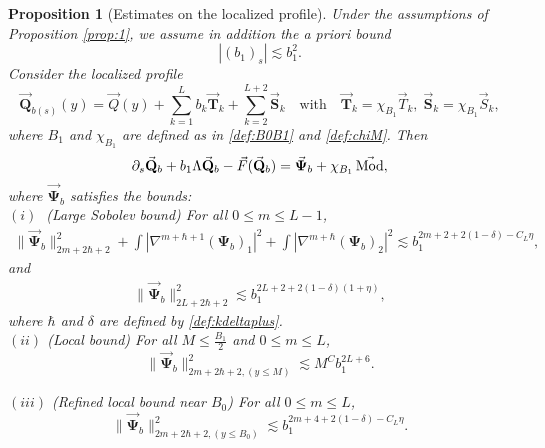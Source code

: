 \documentclass[11pt]{aims}
\newtheorem{proposition}[theorem]{Proposition}
\theoremstyle{definition}
\numberwithin{equation}{section}
\begin{document}
\begin{proposition}[Estimates on the localized profile] \label{prop:localProfile} Under the assumptions of Proposition \ref{prop:1}, we assume in addition the a priori bound 
\begin{equation}\label{eq:apriorib1}
|(b_1)_s| \lesssim b_1^2.
\end{equation}
Consider the localized profile
\begin{equation}\label{def:Qbtil}
\vec{\mathbf{Q}}_{b(s)}(y) = \vec Q(y) + \sum_{k = 1}^Lb_k\vec{\mathbf{T}}_k + \sum_{k = 2}^{L+2}\vec{\mathbf{S}}_k \quad \text{with}\quad \vec{\mathbf{T}}_k = \chi_{B_1}\vec T_k, \; \vec{\mathbf{S}}_k = \chi_{B_1}\vec S_k,
\end{equation}
where $B_1$ and $\chi_{B_1}$ are defined as in \eqref{def:B0B1} and \eqref{def:chiM}. Then
\begin{equation}\label{def:Psibtilde}
\partial_s \vec{\mathbf{Q}}_{b} + b_1 \Lambda \vec{\mathbf{Q}}_b  - \vec F (\vec{\mathbf{Q}}_b) = \vec{\mathbf{\Psi}}_b + \chi_{B_1}\,\vec{\textup{Mod}},
\end{equation}
where $\vec{\mathbf{\Psi}}_{b}$ satisfies the bounds:\\

\noindent $(i)\;$ (Large Sobolev bound) For all $0 \leq m \leq L-1$,
\begin{align}
\|\vec{\mathbf{\Psi}}_b \|_{2m + 2\hbar +2}^2 + \int \left|\nabla^{m + \hbar + 1}(\mathbf{\Psi}_b)_1\right|^2 + \int \left|\nabla^{m + \hbar}(\mathbf{\Psi}_b)_2\right|^2  \lesssim b_1^{2m + 2 + 2(1 - \delta)  - C_L \eta},\label{eq:estPsibLarge1}
\end{align}
and 
\begin{align}
\|\vec{\mathbf{\Psi}}_b \|_{2L + 2\hbar +2}^2 \lesssim b_1^{2L + 2 + 2(1 - \delta)(1 + \eta)},\label{eq:estPsibLarge2}
\end{align}
where $\hbar$ and $\delta$ are defined by \eqref{def:kdeltaplus}. \\

\noindent $(ii)$ (Local bound) For all $M \leq \frac{B_1}{2}$ and $0 \leq m \leq L$, 
\begin{equation}\label{eq:estPsiblocalTilde}
\|\vec{\mathbf{\Psi}}_b \|_{2m + 2\hbar +2, (y \leq M)}^2 \lesssim M^Cb_1^{2L + 6}.
\end{equation}

\noindent $(iii)$ (Refined local bound near $B_0$) For all $0 \leq m \leq L$, 
\begin{equation}\label{eq:estPsiblocalB0}
\|\vec{\mathbf{\Psi}}_b \|_{2m + 2\hbar +2, (y \leq B_0)}^2\lesssim b_1^{2m + 4 + 2(1 - \delta) - C_L\eta}.
\end{equation}
\end{proposition}
\end{document}
